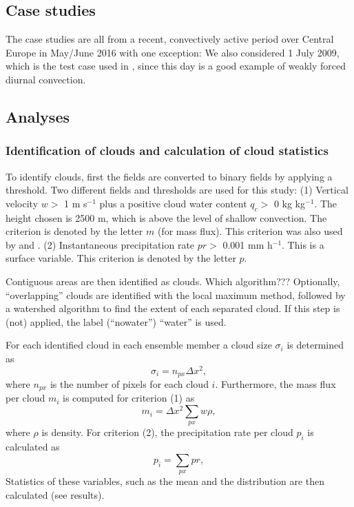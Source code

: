 \documentclass[a4paper, 12pt]{article}
\begin{document}
\subsection{Case studies}
The case studies are all from a recent, convectively active period over Central Europe in May/June 2016 with one exception: We also considered 1 July 2009, which is the test case used in \cite{Kober2016}, since this day is a good example of weakly forced diurnal convection.  

\subsection{Analyses}

\subsubsection{Identification of clouds and calculation of cloud statistics}
To identify clouds, first the fields are converted to binary fields by applying a threshold. Two different fields and thresholds are used for this study: (1) Vertical velocity $w >$ 1 m s$^{-1}$ plus a positive cloud water content $q_c >$ 0 kg kg$^{-1}$. The height chosen is 2500 m, which is above the level of shallow convection. The criterion is denoted by the letter $m$ (for mass flux). This criterion was also used by \cite{Cohen2006} and \cite{Davoudi2010}. (2) Instantaneous precipitation rate $pr >$ 0.001 mm h$^{-1}$. This is a surface variable. This criterion is denoted by the letter $p$. 

Contiguous areas are then identified as clouds. Which algorithm??? Optionally, ``overlapping'' clouds are identified with the local maximum method, followed by a watershed algorithm to find the extent of each separated cloud. If this step is (not) applied, the label (``nowater'') ``water'' is used. 

For each identified cloud in each ensemble member a cloud size $\sigma_i$ is determined as
\begin{equation} \label{eq:cld_size}
 \sigma_i = n_{px} \Delta x^2,
\end{equation}
where $n_{px}$ is the number of pixels for each cloud $i$. Furthermore, the mass flux per cloud $m_i$ is computed for criterion (1) as
\begin{equation} \label{eq:mass_flux_per_cloud}
 m_i = \Delta x^2 \sum_{px} w \rho,
\end{equation}
where $\rho$ is density. For criterion (2), the precipitation rate per cloud $p_i$ is calculated as
\begin{equation} \label{eq:pr_per_cloud}
 p_i = \sum_{px} pr,
\end{equation}
Statistics of these variables, such as the mean and the distribution are then calculated (see results).
\end{document}
